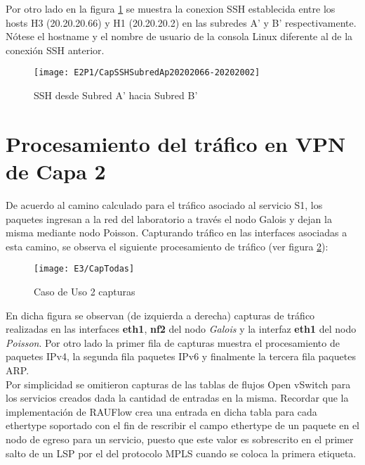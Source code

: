 Por otro lado en la figura \ref{fig:CapSSHSApSBp} se muestra la conexion SSH establecida entre los hosts H3 (20.20.20.66) y H1 (20.20.20.2) en las subredes A' y B' respectivamente. N\'otese el hostname y el nombre de usuario de la consola Linux diferente al de la conexi\'on SSH anterior. 

\newpage
\begin{figure}[ht!] 
\centering    
\texttt{[image: E2P1/CapSSHSubredAp20202066-20202002]}
\caption[SSH desde Subred A' hacia Subred B']{SSH desde Subred A' hacia Subred B'}
\label{fig:CapSSHSApSBp}
\end{figure}

\section{Procesamiento del tr\'afico en VPN de Capa 2}
\label{appendix6.5}

De acuerdo al camino calculado para el tr\'afico asociado al servicio S1, los paquetes ingresan a la red del laboratorio a través el nodo Galois y dejan la misma mediante nodo Poisson. Capturando tr\'afico en las interfaces asociadas a esta camino, se observa el siguiente procesamiento de tr\'afico  
 (ver figura \ref{fig:CapturaTCP}):

\begin{figure}[h!] 
\centering    
\texttt{[image: E3/CapTodas]}
\caption[Caso de Uso 2 capturas]{Caso de Uso 2 capturas}
\label{fig:CapturaTCP}
\end{figure}

En dicha figura se observan (de izquierda a derecha) capturas de tr\'afico realizadas en las interfaces \textbf{eth1}, \textbf{nf2} del nodo \textit{Galois} y la interfaz \textbf{eth1} del nodo \textit{Poisson}. Por otro lado la primer fila de capturas muestra el procesamiento de paquetes IPv4, la segunda fila paquetes IPv6 y finalmente la tercera fila paquetes ARP.\\

Por simplicidad se omitieron capturas de las tablas de flujos Open vSwitch para los servicios creados dada la cantidad de entradas en la misma. Recordar que la implementaci\'on de RAUFlow crea una entrada en dicha tabla para cada ethertype soportado con el fin de rescribir el campo ethertype de un paquete en el nodo de egreso para un servicio, puesto que este valor es sobrescrito en el primer salto de un LSP por el del protocolo MPLS cuando se coloca la primera etiqueta.\\

